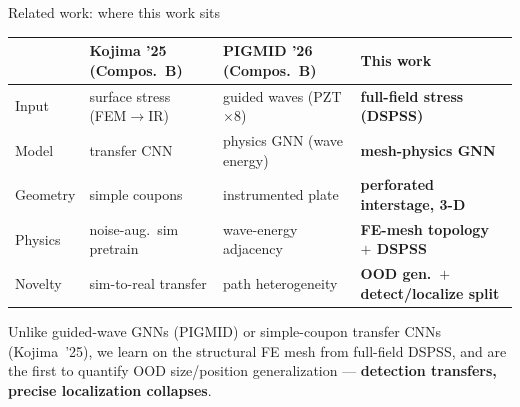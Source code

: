\documentclass[aspectratio=169,12pt]{beamer}
\begin{document}
\begin{frame}{Related work: where this work sits}
\footnotesize
\begin{tabular}{@{}lp{2.05cm}p{2.05cm}p{2.5cm}@{}}
\toprule
 & Kojima '25 (Compos.\ B) & PIGMID '26 (Compos.\ B) & \textbf{This work} \\
\midrule
Input    & surface stress (FEM$\to$IR) & guided waves (PZT$\times$8) & \textbf{full-field stress (DSPSS)} \\
Model    & transfer CNN & physics GNN (wave energy) & \textbf{mesh-physics GNN} \\
Geometry & simple coupons & instrumented plate & \textbf{perforated interstage, 3-D} \\
Physics  & noise-aug.\ sim pretrain & wave-energy adjacency & \textbf{FE-mesh topology $+$ DSPSS} \\
Novelty  & sim-to-real transfer & path heterogeneity & \textbf{OOD gen.\ $+$ detect/localize split} \\
\bottomrule
\end{tabular}
\vspace{0.6em}

{\small Unlike guided-wave GNNs (PIGMID) or simple-coupon transfer CNNs (Kojima~'25),
we learn on the structural FE mesh from full-field DSPSS, and are the first to
quantify OOD size/position generalization --- \textbf{detection transfers,
precise localization collapses}.}
\end{frame}
\end{document}
